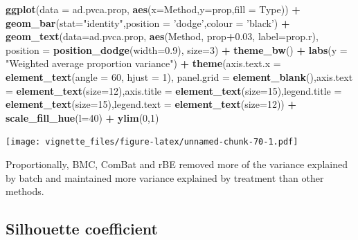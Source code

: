 \documentclass[]{book}
\newenvironment{Shaded}{\begin{snugshade}}{\end{snugshade}}
\newcommand{\KeywordTok}[1]{\textcolor[rgb]{0.13,0.29,0.53}{\textbf{#1}}}
\newcommand{\DataTypeTok}[1]{\textcolor[rgb]{0.13,0.29,0.53}{#1}}
\newcommand{\DecValTok}[1]{\textcolor[rgb]{0.00,0.00,0.81}{#1}}
\newcommand{\FloatTok}[1]{\textcolor[rgb]{0.00,0.00,0.81}{#1}}
\newcommand{\StringTok}[1]{\textcolor[rgb]{0.31,0.60,0.02}{#1}}
\newcommand{\OperatorTok}[1]{\textcolor[rgb]{0.81,0.36,0.00}{\textbf{#1}}}
\newcommand{\NormalTok}[1]{#1}
\begin{document}
\begin{Shaded}
\begin{Highlighting}[]
\KeywordTok{ggplot}\NormalTok{(}\DataTypeTok{data =}\NormalTok{ ad.pvca.prop, }\KeywordTok{aes}\NormalTok{(}\DataTypeTok{x=}\NormalTok{Method,}\DataTypeTok{y=}\NormalTok{prop,}\DataTypeTok{fill =}\NormalTok{ Type)) }\OperatorTok{+}\StringTok{ }\KeywordTok{geom_bar}\NormalTok{(}\DataTypeTok{stat=}\StringTok{"identity"}\NormalTok{,}\DataTypeTok{position =} \StringTok{'dodge'}\NormalTok{,}\DataTypeTok{colour =} \StringTok{'black'}\NormalTok{) }\OperatorTok{+}\StringTok{ }\KeywordTok{geom_text}\NormalTok{(}\DataTypeTok{data=}\NormalTok{ad.pvca.prop, }\KeywordTok{aes}\NormalTok{(Method, prop}\OperatorTok{+}\FloatTok{0.03}\NormalTok{, }\DataTypeTok{label=}\NormalTok{prop.r), }\DataTypeTok{position =} \KeywordTok{position_dodge}\NormalTok{(}\DataTypeTok{width=}\FloatTok{0.9}\NormalTok{), }\DataTypeTok{size=}\DecValTok{3}\NormalTok{) }\OperatorTok{+}\StringTok{ }\KeywordTok{theme_bw}\NormalTok{() }\OperatorTok{+}\StringTok{ }\KeywordTok{labs}\NormalTok{(}\DataTypeTok{y =} \StringTok{"Weighted average proportion variance"}\NormalTok{) }\OperatorTok{+}\StringTok{ }\KeywordTok{theme}\NormalTok{(}\DataTypeTok{axis.text.x =} \KeywordTok{element_text}\NormalTok{(}\DataTypeTok{angle =} \DecValTok{60}\NormalTok{, }\DataTypeTok{hjust =} \DecValTok{1}\NormalTok{), }\DataTypeTok{panel.grid =} \KeywordTok{element_blank}\NormalTok{(),}\DataTypeTok{axis.text =} \KeywordTok{element_text}\NormalTok{(}\DataTypeTok{size=}\DecValTok{12}\NormalTok{),}\DataTypeTok{axis.title =} \KeywordTok{element_text}\NormalTok{(}\DataTypeTok{size=}\DecValTok{15}\NormalTok{),}\DataTypeTok{legend.title =} \KeywordTok{element_text}\NormalTok{(}\DataTypeTok{size=}\DecValTok{15}\NormalTok{),}\DataTypeTok{legend.text =} \KeywordTok{element_text}\NormalTok{(}\DataTypeTok{size=}\DecValTok{12}\NormalTok{)) }\OperatorTok{+}\StringTok{ }\KeywordTok{scale_fill_hue}\NormalTok{(}\DataTypeTok{l=}\DecValTok{40}\NormalTok{) }\OperatorTok{+}\StringTok{ }\KeywordTok{ylim}\NormalTok{(}\DecValTok{0}\NormalTok{,}\DecValTok{1}\NormalTok{)}
\end{Highlighting}
\end{Shaded}

\texttt{[image: vignette\_files/figure-latex/unnamed-chunk-70-1.pdf]}

Proportionally, BMC, ComBat and rBE removed more of the variance
explained by batch and maintained more variance explained by treatment
than other methods.

\subsection{Silhouette coefficient}\label{silhouette-coefficient}
\end{document}
